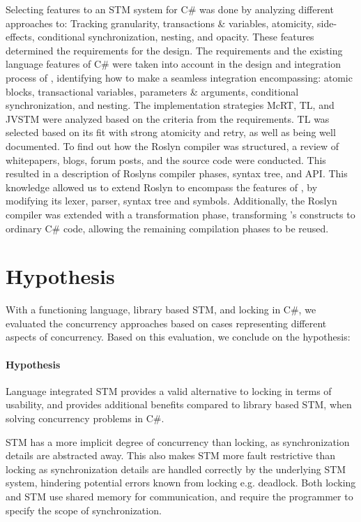Selecting features to an \ac{STM} system for C\# was done by analyzing different approaches to: Tracking granularity, transactions \& variables, atomicity, side-effects, conditional synchronization, nesting, and opacity. These features determined the requirements for the design. The requirements and the existing language features of C\# were taken into account in the design and integration process of \stmname, identifying how to make a seamless integration encompassing: atomic blocks, transactional variables, parameters \& arguments, conditional synchronization, and nesting. The implementation strategies McRT, TL, and JVSTM were analyzed based on the criteria from the requirements. TL was selected based on its fit with strong atomicity and retry, as well as being well documented. To find out how the Roslyn compiler was structured, a review of whitepapers, blogs, forum posts, and the source code were conducted. This resulted in a description of Roslyns compiler phases, syntax tree, and \ac{API}. This knowledge allowed us to extend Roslyn to encompass the features of \stmname, by modifying its lexer, parser, syntax tree and symbols. Additionally, the Roslyn compiler was extended with a transformation phase, transforming \stmname's constructs to ordinary C\# code, allowing the remaining compilation phases to be reused.

\section{Hypothesis}
With a functioning \stmname language, library based \ac{STM}, and locking in C\#, we evaluated the concurrency approaches based on cases representing different aspects of concurrency. Based on this evaluation, we conclude on the hypothesis: 

\paragraph{Hypothesis} Language integrated \ac{STM} provides a valid alternative to locking in terms of usability, and provides additional benefits compared to library based \ac{STM}, when solving concurrency problems in C\#. 

\ac{STM} has a more implicit degree of concurrency than locking, as synchronization details are abstracted away. This also makes \ac{STM} more fault restrictive than locking as synchronization details are handled correctly by the underlying \ac{STM} system, hindering potential errors known from locking e.g. deadlock. Both locking and \ac{STM} use shared memory for communication, and require the programmer to specify the scope of synchronization.

